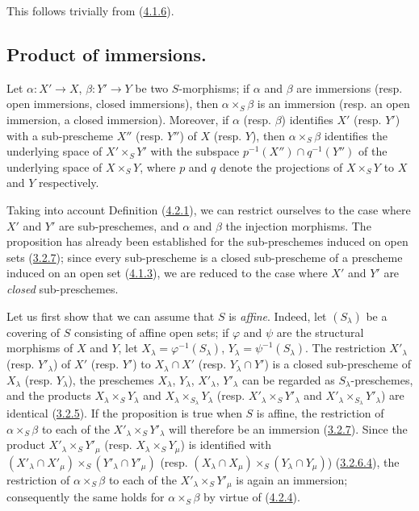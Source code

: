 This follows trivially from (\hyperref[I.4.1.6]{4.1.6}).

\subsection{Product of immersions.}
\label{subsection:I.4.3}

\begin{proposition}[4.3.1]
\label{I.4.3.1}
Let $\alpha:X'\to X$, $\beta:Y'\to Y$ be two $S$-morphisms; if $\alpha$ and
$\beta$ are immersions (\textup{resp.} open immersions, closed
immersions), then $\alpha\times_S\beta$ is an immersion (\textup{resp.} an open
immersion, a closed immersion). Moreover, if $\alpha$ (\textup{resp.} $\beta$)
identifies $X'$ (\textup{resp.} $Y'$) with a sub-prescheme $X''$ (\textup{resp.} $Y''$) of $X$
(\textup{resp.} $Y$), then $\alpha\times_S\beta$ identifies the underlying space of
$X'\times_S Y'$ with the subspace $p^{-1}(X'')\cap q^{-1}(Y'')$ of the
underlying space of $X\times_S Y$, where $p$ and $q$ denote the projections of
$X\times_S Y$ to $X$ and $Y$ respectively.
\end{proposition}

Taking into account Definition (\hyperref[I.4.2.1]{4.2.1}), we can restrict
ourselves to the case where $X'$ and $Y'$ are sub-preschemes, and $\alpha$ and
$\beta$ the injection morphisms. The proposition has already been established
for the sub-preschemes induced on open sets (\hyperref[I.3.2.7]{3.2.7});
since every sub-prescheme is a closed sub-prescheme of a prescheme induced on an
open set (\hyperref[I.4.1.3]{4.1.3}), we are reduced to the case where $X'$
and $Y'$ are \emph{closed} sub-preschemes.

Let us first show that we can assume that $S$ is \emph{affine}. Indeed, let
$(S_\lambda)$ be a covering of $S$ consisting of affine open sets; if
$\varphi$ and $\psi$ are the structural morphisms of $X$ and $Y$, let
$X_\lambda=\varphi^{-1}(S_\lambda)$, $Y_\lambda=\psi^{-1}(S_\lambda)$. The
restriction $X'_\lambda$ (resp. $Y'_\lambda$) of $X'$ (resp. $Y'$) to
$X_\lambda\cap X'$ (resp. $Y_\lambda\cap Y'$) is a closed sub-prescheme of
$X_\lambda$ (resp. $Y_\lambda$), the preschemes $X_\lambda$, $Y_\lambda$,
$X'_\lambda$, $Y'_\lambda$ can be regarded as
$S_\lambda$-preschemes, and the products $X_\lambda\times_S Y_\lambda$ and
$X_\lambda\times_{S_\lambda}Y_\lambda$ (resp.
$X'_\lambda\times_S Y'_\lambda$ and
$X'_\lambda\times_{S_\lambda}Y'_\lambda$) are identical
(\hyperref[I.3.2.5]{3.2.5}). If the proposition is true when $S$ is
affine, the restriction of $\alpha\times_S\beta$ to each of the
$X'_\lambda\times_S Y'_\lambda$ will therefore be an immersion
(\hyperref[I.3.2.7]{3.2.7}). Since the product
$X'_\lambda\times_S Y'_\mu$ (resp. $X_\lambda\times_S Y_\mu$) is identified
with $(X'_\lambda\cap X'_\mu)\times_S(Y'_\lambda\cap Y'_\mu)$ (resp.
$(X_\lambda\cap X_\mu)\times_S(Y_\lambda\cap Y_\mu)$)
(\hyperref[I.3.2.6.4]{3.2.6.4}), the restriction of
$\alpha\times_S\beta$
to each of the $X'_\lambda\times_S Y'_\mu$ is again an immersion; consequently
the same holds for $\alpha\times_S\beta$ by virtue of
(\hyperref[I.4.2.4]{4.2.4}).

